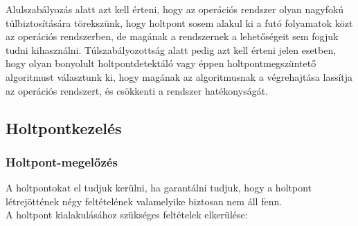 \documentclass[tikz,12pt,margin=0px]{article}
\begin{document}
    \noindent Alulszabályozás alatt azt kell érteni, hogy az operációs rendszer olyan nagyfokú túlbiztosítására törekszünk, hogy holtpont sosem alakul ki a futó folyamatok közt az operációs rendszerben, de magának a rendszernek a lehetőségeit sem fogjuk tudni kihasználni. Túlszabályozottság alatt pedig azt kell érteni jelen esetben, hogy olyan bonyolult holtpontdetektáló vagy éppen holtpontmegszüntető algoritmust választunk ki, hogy magának az algoritmusnak a végrehajtása lassítja az operációs rendszert, és csökkenti a rendszer hatékonyságát.

	\subsection*{Holtpontkezelés\\}

    \subsubsection*{Holtpont-megelőzés\\}

    A holtpontokat el tudjuk kerülni, ha garantálni tudjuk, hogy a holtpont létrejöttének négy feltételének valamelyike biztosan nem áll fenn.\\

    \noindent A holtpont kialakulásához szükséges feltételek elkerülése:
\end{document}
